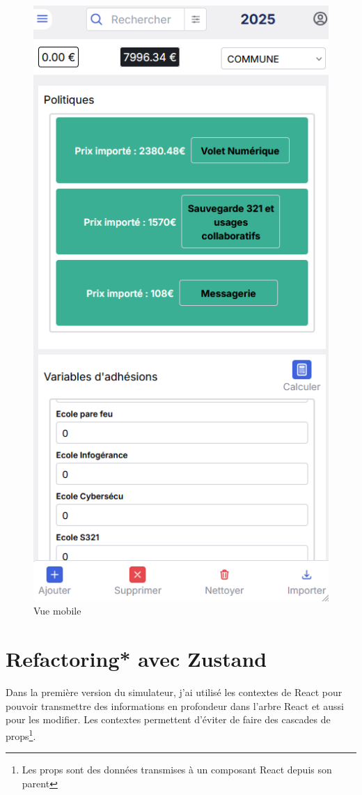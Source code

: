 \documentclass[a4paper,12pt]{report}
\begin{document}
\begin{figure}[H]
    \centering
    \includegraphics[scale=0.3]{vueMobile.png}
    \caption{Vue mobile}
    \label{fig:mobile-view}
\end{figure}


\section{Refactoring* avec Zustand}
Dans la première version du simulateur, j'ai utilisé les contextes de React pour pouvoir transmettre des informations en profondeur dans l'arbre React et aussi pour les modifier. Les contextes permettent d'éviter de faire des cascades de props\footnote{Les props sont des données transmises à un composant React depuis son parent}.
\end{document}
